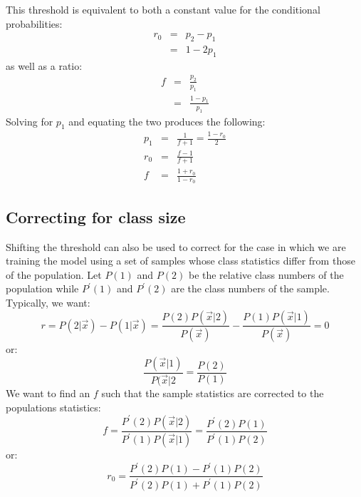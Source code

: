 \documentclass{article}
\begin{document}
This threshold is equivalent to both a constant value for the conditional
probabilities:
\begin{eqnarray}
r_0 & = & p_2 - p_1 \\
& = & 1 - 2 p_1
\end{eqnarray}
as well as a ratio:
\begin{eqnarray}
f & = & \frac{p_2}{p_1} \\
  & = & \frac{1 - p_1}{p_1}
\end{eqnarray}
Solving for $p_1$ and equating the two produces the following:\
\begin{eqnarray}
p_1 & = & \frac{1}{f+1} = \frac{1 - r_0}{2} \\
r_0 & = & \frac{f-1}{f+1} \\
f & = & \frac{1+r_0}{1-r_0}
\end{eqnarray}

\subsection{Correcting for class size}

Shifting the threshold can also be used to correct for the case in which we
are training the model using a set of samples whose class statistics
differ from those of the population.
Let $P(1)$ and $P(2)$ be the relative class numbers of the population while
$P^\prime(1)$ and $P^\prime(2)$ are the class numbers of the sample.
Typically, we want:
\begin{equation}
r=P(2|\vec x)-P(1|\vec x)=
\frac{P(2)P(\vec x|2)}{P(\vec x)}-\frac{P(1)P(\vec x|1)}{P(\vec x)} = 0
\end{equation}
or:
\begin{equation}
\frac{P(\vec x|1)}{P(\vec x|2}=\frac{P(2)}{P(1)}
\end{equation}
We want to find an $f$ such that the sample statistics are corrected to
the populations statistics:
\begin{equation}
f = \frac{P^\prime(2)P(\vec x|2)}{P^\prime(1)P(\vec x|1)}
=\frac{P^\prime(2) P(1)}{P^\prime(1) P(2)}
\end{equation}
or:
\begin{equation}
r_0=\frac{P^\prime(2)P(1) - P^\prime(1) P(2)}
	{P^\prime(2)P(1) + P^\prime(1)P(2)}
\end{equation}
\end{document}
